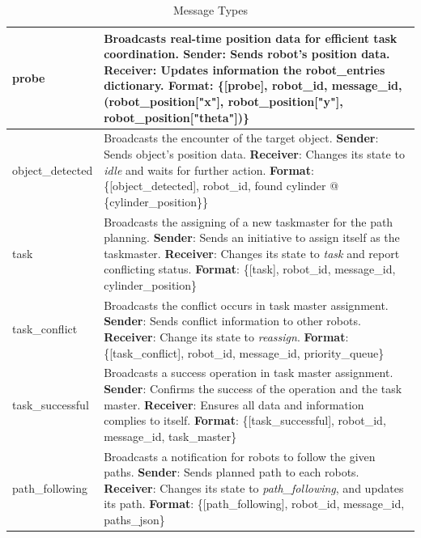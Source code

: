 \begin{table}[ht]
\centering
\begin{tabular}{|p{3cm}|p{12cm}|}
\hline
 probe & Broadcasts real-time position data for efficient task coordination. 
 \newline \textbf{Sender}: Sends robot's position data. 
 \newline \textbf{Receiver}: Updates information the robot\_entries dictionary. 
 \newline \textbf{Format}: \{[probe], robot\_id, message\_id, (robot\_position["x"], robot\_position["y"], robot\_position["theta"])\} \\ 
 \hline
 object\_detected & Broadcasts the encounter of the target object. 
 \newline \textbf{Sender}: Sends object's position data. \newline \textbf{Receiver}: Changes its state to \textit{idle} and waits for further action. \newline \textbf{Format}: \{[object\_detected], robot\_id, found cylinder @ \{cylinder\_position\}\} \\ 
 \hline
 task & Broadcasts the assigning of a new taskmaster for the path planning. 
 \newline \textbf{Sender}: Sends an initiative to assign itself as the taskmaster. 
 \newline \textbf{Receiver}: Changes its state to \textit{task} and report conflicting status. 
 \newline \textbf{Format}: \{[task], robot\_id, message\_id, cylinder\_position\}\\ 
 \hline
 task\_conflict & Broadcasts the conflict occurs in task master assignment. 
 \newline \textbf{Sender}: Sends conflict information to other robots. \newline \textbf{Receiver}: Change its state to \textit{reassign}. 
 \newline \textbf{Format}: \{[task\_conflict], robot\_id, message\_id, priority\_queue\}\\ 
 \hline
 task\_successful & Broadcasts a success operation in task master assignment.  
 \newline \textbf{Sender}: Confirms the success of the operation and the task master. 
 \newline \textbf{Receiver}: Ensures all data and information complies to itself.
 \newline \textbf{Format}: \{[task\_successful], robot\_id, message\_id, task\_master\}\\ 
 \hline
 path\_following & Broadcasts a notification for robots to follow the given paths.  
 \newline \textbf{Sender}: Sends planned path to each robots. 
 \newline \textbf{Receiver}: Changes its state to \textit{path\_following}, and updates its path.
 \newline \textbf{Format}: \{[path\_following], robot\_id, message\_id, paths\_json\}\\ 
 \hline
\end{tabular}
\caption{Message Types}
\end{table}


